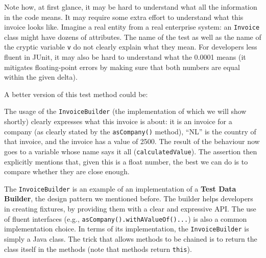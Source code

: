 Note how, at first glance, it may be hard to understand what all the
information in the code means. It may require some extra effort to
understand what this invoice looks like. Imagine a real entity from a
real enterprise system: an \texttt{Invoice} class might have dozens of
attributes. The name of the test as well as the name of the cryptic
variable \texttt{v} do not clearly explain what they mean. For
developers less fluent in JUnit, it may also be hard to understand what
the 0.0001 means (it mitigates floating-point errors by making sure that
both numbers are equal within the given delta).

A better version of this test method could be:

\begin{Shaded}
\begin{Highlighting}[]
 \NormalTok{() \{}
 \NormalTok{()}
\NormalTok{()}
\NormalTok{(}\NormalTok{)}
\NormalTok{(}\NormalTok{)}
\NormalTok{();}

\NormalTok{();}

    \NormalTok{(} \NormalTok{(}\NormalTok{), }\NormalTok{(} \NormalTok{(}\NormalTok{)));}
\NormalTok{\} }
\end{Highlighting}
\end{Shaded}

The usage of the \texttt{InvoiceBuilder} (the implementation of which we
will show shortly) clearly expresses what this invoice is about: it is
an invoice for a company (as clearly stated by the \texttt{asCompany()}
method), ``NL'' is the country of that invoice, and the invoice has a
value of 2500. The result of the behaviour now goes to a variable whose
name says it all (\texttt{calculatedValue}). The assertion then
explicitly mentions that, given this is a float number, the best we can
do is to compare whether they are close enough.

The \texttt{InvoiceBuilder} is an example of an implementation of a
\textbf{Test Data Builder}, the design pattern we mentioned before. The
builder helps developers in creating fixtures, by providing them with a
clear and expressive API. The use of fluent interfaces (e.g.,
\texttt{asCompany().withAValueOf()...}) is also a common implementation
choice. In terms of its implementation, the \texttt{InvoiceBuilder} is
simply a Java class. The trick that allows methods to be chained is to
return the class itself in the methods (note that methods return
\texttt{this}).

